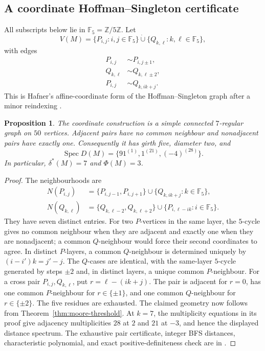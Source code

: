 \documentclass[a4paper,10pt,reqno]{amsart}
\theoremstyle{plain}
\newtheorem{proposition}[theorem]{Proposition}
\theoremstyle{definition}
\theoremstyle{remark}
\newcommand{\F}{\mathbb F_5}
\newcommand{\Spec}{\operatorname{Spec}}
\newcommand{\RepoTag}{v2.2.6}
\newcommand{\codefile}[1]{%
  \href{https://github.com/SamPetkov/wow284/blob/\RepoTag/#1}{\path{#1}}}
\begin{document}
\subsection{A coordinate Hoffman--Singleton certificate}

All subscripts below lie in \(\F=\mathbb Z/5\mathbb Z\).  Let
\[
 V(M)=\{P_{i,j}:i,j\in\F\}\mathbin{\dot\cup}
      \{Q_{k,\ell}:k,\ell\in\F\},
\]
with edges
\begin{align*}
 P_{i,j}&\sim P_{i,j\pm1},\\
 Q_{k,\ell}&\sim Q_{k,\ell\pm2},\\
 P_{i,j}&\sim Q_{k,ik+j}.
\end{align*}
This is Hafner's affine-coordinate form of the Hoffman--Singleton graph after a
minor reindexing \cite{Hafner2003}.

\begin{proposition}\label{prop:hs-coordinate}
The coordinate construction is a simple connected \(7\)-regular graph on
\(50\) vertices.  Adjacent pairs have no common neighbour and nonadjacent pairs
have exactly one.  Consequently it has girth five, diameter two, and
\[
 \Spec D(M)=\{91^{(1)},1^{(21)},(-4)^{(28)}\}.
\]
In particular, \(\delta^*(M)=7\) and \(\Phi(M)=3\).
\end{proposition}

\begin{proof}
The neighbourhoods are
\begin{align*}
N(P_{i,j})&=\{P_{i,j-1},P_{i,j+1}\}
 \cup\{Q_{k,ik+j}:k\in\F\},\\
N(Q_{k,\ell})&=\{Q_{k,\ell-2},Q_{k,\ell+2}\}
 \cup\{P_{i,\ell-ik}:i\in\F\}.
\end{align*}
They have seven distinct entries.  For two \(P\)-vertices in the same layer,
the \(5\)-cycle gives no common neighbour when they are adjacent and exactly
one when they are nonadjacent; a common \(Q\)-neighbour would force their
second coordinates to agree.  In distinct \(P\)-layers, a common
\(Q\)-neighbour is determined uniquely by
\((i-i')k=j'-j\).  The \(Q\)-cases are identical, with the same-layer
\(5\)-cycle generated by steps \(\pm2\) and, in distinct layers, a unique
common \(P\)-neighbour.  For a cross pair \(P_{i,j},Q_{k,\ell}\), put
\(r=\ell-(ik+j)\).  The pair is adjacent for \(r=0\), has one common
\(P\)-neighbour for \(r\in\{\pm1\}\), and one common \(Q\)-neighbour for
\(r\in\{\pm2\}\).  The five residues are exhausted.  The claimed geometry
now follows from Theorem~\ref{thm:moore-threshold}.  At \(k=7\), the
multiplicity equations in its proof give adjacency multiplicities \(28\) at
\(2\) and \(21\) at \(-3\), and hence the displayed distance spectrum.  The exhaustive
pair certificate, integer BFS distances, characteristic polynomial, and exact
positive-definiteness check are in \codefile{scripts/verify_exact.py}.
\end{proof}
\end{document}
